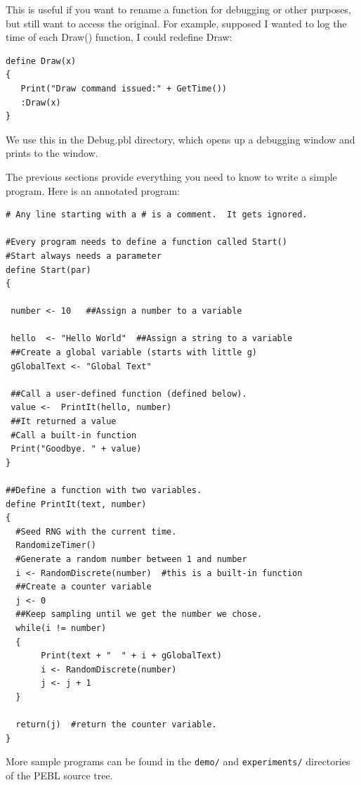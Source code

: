 This is useful if you want to rename a function for debugging or other purposes, but still want to access the original.  For example, supposed I wanted to log the time of each Draw() function, I could redefine Draw:

\begin{verbatim}
define Draw(x)
{
   Print("Draw command issued:" + GetTime())
   :Draw(x)
}

\end{verbatim}
We use this in the Debug.pbl directory, which opens up a debugging window and prints to the window.

\newpage
{}

The previous sections provide everything you need to know to
write a simple program.  Here is an annotated program:

\begin{verbatim}
# Any line starting with a # is a comment.  It gets ignored.

#Every program needs to define a function called Start() 
#Start always needs a parameter
define Start(par)
{

 number <- 10   ##Assign a number to a variable

 hello  <- "Hello World"  ##Assign a string to a variable
 ##Create a global variable (starts with little g)
 gGlobalText <- "Global Text"

 ##Call a user-defined function (defined below).
 value <-  PrintIt(hello, number)
 ##It returned a value
 #Call a built-in function
 Print("Goodbye. " + value)
}

##Define a function with two variables.
define PrintIt(text, number)
{
  #Seed RNG with the current time.
  RandomizeTimer()
  #Generate a random number between 1 and number
  i <- RandomDiscrete(number)  #this is a built-in function
  ##Create a counter variable
  j <- 0
  ##Keep sampling until we get the number we chose.
  while(i != number)
  {
       Print(text + "  " + i + gGlobalText)
       i <- RandomDiscrete(number)
       j <- j + 1
  }

  return(j)  #return the counter variable.
}
\end{verbatim}
More sample programs can be found in the \texttt{demo/} and \texttt{experiments/} directories of the PEBL source tree.


